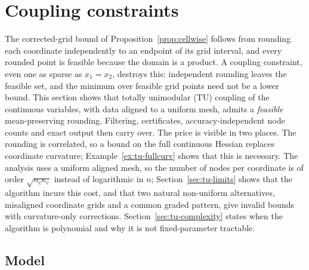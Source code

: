\section{Coupling constraints}\label{sec:constraints}

The corrected-grid bound of Proposition~\ref{prop:cellwise} follows from
rounding each coordinate independently to an endpoint of its grid interval,
and every rounded point is feasible because the domain is a product. A coupling constraint, even one as sparse as $x_1=x_2$, destroys
this: independent rounding leaves the feasible set, and the minimum over
feasible grid points need not be a lower bound. This section shows that
totally unimodular (TU) coupling of the continuous variables, with data
aligned to a uniform mesh, admits a \emph{feasible} mean-preserving rounding.
Filtering, certificates, accuracy-independent node counts and exact output
then carry over. The price is visible in two places. The rounding is
correlated, so a bound on the full continuous Hessian replaces coordinate
curvature; Example~\ref{ex:tu-fullcurv} shows that this is necessary. The
analysis uses a uniform aligned mesh, so the number of nodes per coordinate
is of order $\sqrt{n_c\kappa_c}$ instead of logarithmic in $n$;
Section~\ref{sec:tu-limits} shows that the algorithm incurs this cost, and
that two natural non-uniform alternatives, misaligned coordinate grids and a
common graded pattern, give invalid bounds with curvature-only corrections.
Section~\ref{sec:tu-complexity} states when the algorithm is polynomial and
why it is not fixed-parameter tractable.

\subsection{Model}\label{sec:tu-model}

